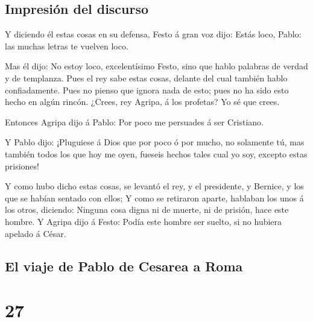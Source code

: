 \hypertarget{impresiuxf3n-del-discurso}{%
\subsection{Impresión del discurso}\label{impresiuxf3n-del-discurso}}

 Y diciendo él estas cosas en su defensa, Festo á gran
voz dijo: Estás loco, Pablo: las muchas letras te vuelven loco.

 Mas él dijo: No estoy loco, excelentísimo Festo, sino
que hablo palabras de verdad y de templanza.  Pues el rey
sabe estas cosas, delante del cual también hablo confiadamente. Pues no
pienso que ignora nada de esto; pues no ha sido esto hecho en algún
rincón.  ¿Crees, rey Agripa, á los profetas? Yo sé que
crees.

 Entonces Agripa dijo á Pablo: Por poco me persuades á
ser Cristiano.

 Y Pablo dijo: ¡Pluguiese á Dios que por poco ó por
mucho, no solamente tú, mas también todos los que hoy me oyen, fueseis
hechos tales cual yo soy, excepto estas prisiones!

 Y como hubo dicho estas cosas, se levantó el rey, y el
presidente, y Bernice, y los que se habían sentado con ellos;
 Y como se retiraron aparte, hablaban los unos á los
otros, diciendo: Ninguna cosa digna ni de muerte, ni de prisión, hace
este hombre.  Y Agripa dijo á Festo: Podía este hombre
ser suelto, si no hubiera apelado á César.

\hypertarget{el-viaje-de-pablo-de-cesarea-a-roma}{%
\subsection{El viaje de Pablo de Cesarea a
Roma}\label{el-viaje-de-pablo-de-cesarea-a-roma}}

\hypertarget{section-44-27}{%
\section{27}\label{section-44-27}}

